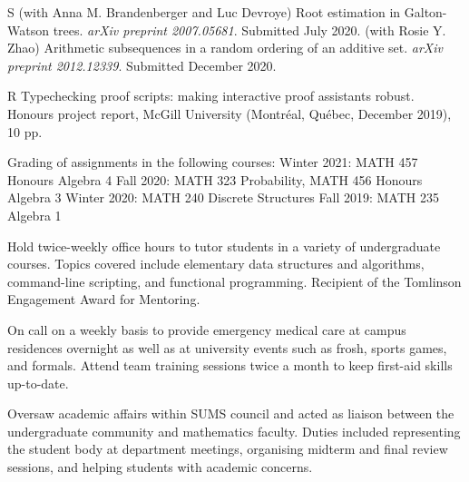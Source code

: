 
\pubbegin S
\subitem (with Anna M. Brandenberger and Luc Devroye)
Root estimation in Galton-Watson trees. {\sl arXiv preprint 2007.05681}.
Submitted July 2020.
\subitem (with Rosie Y. Zhao)
Arithmetic subsequences in a random ordering of an additive set. {\sl arXiv preprint 2012.12339}.
Submitted December 2020.


\pubbegin R
\repitem Typechecking proof scripts: making interactive proof assistants robust.
Honours project report, McGill University (Montr\'eal, Qu\'ebec, December 2019), 10 pp.

\filbreak


\smallskip
Grading of assignments in the following courses:
\begingroup\parindent=10pt
\smallskip
\thing Winter 2021: MATH 457 Honours Algebra 4
\smallskip
\thing Fall 2020: MATH 323 Probability, MATH 456 Honours Algebra 3
\smallskip
\thing Winter 2020: MATH 240 Discrete Structures
\smallskip
\thing Fall 2019: MATH 235 Algebra 1
\endgroup
\medbreak

\smallskip
Hold twice-weekly office hours to tutor students in a variety of undergraduate courses.
Topics covered include elementary data structures and algorithms, command-line scripting,
and functional programming. Recipient of the Tomlinson Engagement Award for Mentoring.
\medbreak

\smallskip
On call on a weekly basis to provide emergency medical care at campus residences overnight as well as at
university events such as frosh, sports games, and formals. Attend team training sessions twice a month to keep
first-aid skills up-to-date.
\medbreak

\smallskip
Oversaw academic affairs within SUMS council and acted as liaison between the undergraduate community and
mathematics faculty. Duties included representing the student body at department meetings,
organising midterm and final review sessions,
and helping students with
academic concerns.
\medbreak

